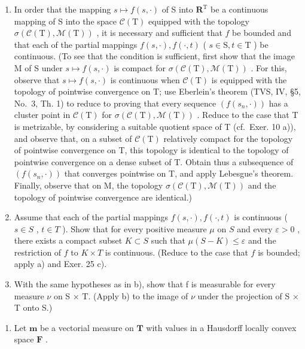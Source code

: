 \begin{enumerate}
\def\labelenumi{\alph{enumi})}
\item
  In order that the mapping \(s \mapsto f(s, \cdot)\) of S into \(\mathbf{R}^{\mathrm{T}}\) be a continuous mapping of S into the space \(\mathcal{C}(\mathrm{T})\) equipped with the topology \(\sigma(\mathcal{C}(\mathrm{T}), \mathcal{M}(\mathrm{T}))\) , it is necessary and sufficient that \(f\) be bounded and that each of the partial mappings \(f(s, \cdot), f(\cdot, t)\) ( \(s \in \mathrm{S}, t \in \mathrm{T}\) ) be continuous. (To see that the condition is sufficient, first show that the image M of S under \(s \mapsto f(s, \cdot)\) is compact for \(\sigma(\mathcal{C}(\mathrm{T}), \mathcal{M}(\mathrm{T}))\) . For this, observe that \(s \mapsto f(s, \cdot)\) is continuous when \(\mathcal{C}(\mathrm{T})\) is equipped with the topology of pointwise convergence on T; use Eberlein's theorem (TVS, IV, §5, No.~3, Th. 1) to reduce to proving that every sequence \((f(s_n, \cdot))\) has a cluster point in \(\mathcal{C}(\mathrm{T})\) for \(\sigma(\mathcal{C}(\mathrm{T}), \mathcal{M}(\mathrm{T}))\) . Reduce to the case that T is metrizable, by considering a suitable quotient space of T (cf.~Exer. 10 a)), and observe that, on a subset of \(\mathcal{C}(\mathrm{T})\) relatively compact for the topology of pointwise convergence on T, this topology is identical to the topology of pointwise convergence on a dense subset of T. Obtain thus a subsequence of \((f(s_n, \cdot))\) that converges pointwise on T, and apply Lebesgue's theorem. Finally, observe that on M, the topology \(\sigma(\mathcal{C}(\mathrm{T}), \mathcal{M}(\mathrm{T}))\) and the topology of pointwise convergence are identical.)
\item
  Assume that each of the partial mappings \(f(s, \cdot), f(\cdot, t)\) is continuous ( \(s \in S\) , \(t \in T\) ). Show that for every positive measure \(\mu\) on \(S\) and every \(\varepsilon > 0\) , there exists a compact subset \(K \subset S\) such that \(\mu(S - K) \leqslant \varepsilon\) and the restriction of \(f\) to \(K \times T\) is continuous. (Reduce to the case that \(f\) is bounded; apply a) and Exer. 25 c).
\item
  With the same hypotheses as in b), show that f is measurable for every measure \(\nu\) on S × T. (Apply b) to the image of \(\nu\) under the projection of S × T onto S.)
\end{enumerate}

\begin{enumerate}
\def\labelenumi{\arabic{enumi})}
\setcounter{enumi}{26}
\tightlist
\item
  Let \(\mathbf{m}\) be a vectorial measure on \(\mathbf{T}\) with values in a Hausdorff locally convex space \(\mathbf{F}\) .
\end{enumerate}

